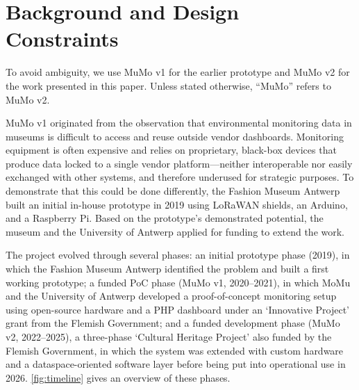 \section{Background and Design Constraints}\label{sec:context}

To avoid ambiguity, we use MuMo v1 for the earlier prototype and MuMo v2
for the work presented in this paper. Unless stated otherwise, ``MuMo''
refers to MuMo v2.

MuMo v1 originated from the observation that environmental monitoring
data in museums is difficult to access and reuse outside vendor
dashboards. Monitoring equipment is often expensive and relies on
proprietary, black-box devices that produce data locked to a single
vendor platform---neither interoperable nor easily exchanged with other
systems, and therefore underused for strategic purposes. To demonstrate
that this could be done differently, the Fashion Museum Antwerp built an
initial in-house prototype in 2019 using LoRaWAN shields, an Arduino,
and a Raspberry Pi. Based on the prototype's demonstrated potential, the
museum and the University of Antwerp applied for funding to extend the
work.

The project evolved through several phases: an initial prototype phase
(2019), in which the Fashion Museum Antwerp identified the problem and
built a first working prototype; a funded PoC phase (MuMo v1,
2020--2021), in which MoMu and the University of Antwerp developed a
proof-of-concept monitoring setup using open-source hardware and a PHP
dashboard under an `Innovative Project' grant from the Flemish
Government; and a funded development phase (MuMo v2, 2022--2025), a
three-phase `Cultural Heritage Project' also funded by the Flemish
Government, in which the system was extended with custom hardware and a
dataspace-oriented software layer before being put into operational use
in 2026. \autoref{fig:timeline} gives an overview of these phases.

